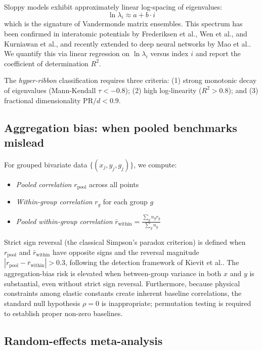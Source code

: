 \documentclass[twocolumn,9pt]{extarticle}
\begin{document}
Sloppy models exhibit approximately linear log-spacing of eigenvalues:
\begin{equation}
\ln \lambda_i \approx a + b \cdot i
\end{equation}
which is the signature of Vandermonde matrix ensembles\cite{waterfall2006}. This spectrum has been confirmed in interatomic potentials by Frederiksen et al.\cite{frederiksen2004}, Wen et al.\cite{wen2017}, and Kurniawan et al.\cite{kurniawan2022}, and recently extended to deep neural networks by Mao et al.\cite{mao2024,mao2026}. We quantify this via linear regression on $\ln \lambda_i$ versus index $i$ and report the coefficient of determination $R^2$.

The \textit{hyper-ribbon} classification requires three criteria: (1) strong monotonic decay of eigenvalues (Mann-Kendall $\tau < -0.8$); (2) high log-linearity ($R^2 > 0.8$); and (3) fractional dimensionality $\text{PR}/d < 0.9$.

\subsection{Aggregation bias: when pooled benchmarks mislead}

For grouped bivariate data $\{(x_j, y_j, g_j)\}$, we compute:
\begin{itemize}
\item \textit{Pooled correlation} $r_\text{pool}$ across all points
\item \textit{Within-group correlation} $r_g$ for each group $g$
\item \textit{Pooled within-group correlation} $\bar{r}_\text{within} = \frac{\sum_g n_g r_g}{\sum_g n_g}$
\end{itemize}

Strict sign reversal (the classical Simpson's paradox criterion) is defined when $r_\text{pool}$ and $\bar{r}_\text{within}$ have opposite signs and the reversal magnitude $|r_\text{pool} - \bar{r}_\text{within}| > 0.3$, following the detection framework of Kievit et al.\cite{kievit2013}. The aggregation-bias risk is elevated when between-group variance in both $x$ and $y$ is substantial, even without strict sign reversal. Furthermore, because physical constraints among elastic constants create inherent baseline correlations, the standard null hypothesis $\rho = 0$ is inappropriate\cite{jackson1991,archie1981}; permutation testing is required to establish proper non-zero baselines.

\subsection{Random-effects meta-analysis}
\end{document}
